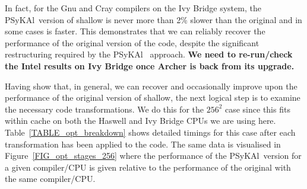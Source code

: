 \documentclass[journal]{IEEEtran}
\newcommand{\psykal}{{PS}y{KA}l\ }
\begin{document}
In fact, for the Gnu and Cray compilers on the Ivy Bridge system, the
\psykal version of shallow is never more than 2\% slower than the
original and in some cases is faster.  This demonstrates that we can
reliably recover the performance of the original version of the code,
despite the significant restructuring required by the \psykal
approach. {\bf We need to re-run/check the Intel results on Ivy Bridge
  once Archer is back from its upgrade.}

Having show that, in general, we can recover and occasionally improve
upon the performance of the original version of shallow, the next
logical step is to examine the necessary code transformations.  We do
this for the $256^{2}$ case since this fits within cache on both the
Haswell and Ivy Bridge CPUs we are using here.
Table~\ref{TABLE_opt_breakdown} shows detailed timings for this case
after each transformation has been applied to the code. The same data
is visualised in Figure~\ref{FIG_opt_stages_256} where the performance
of the \psykal version for a given compiler/CPU is given relative to
the performance of the original with the same compiler/CPU. 
\end{document}

